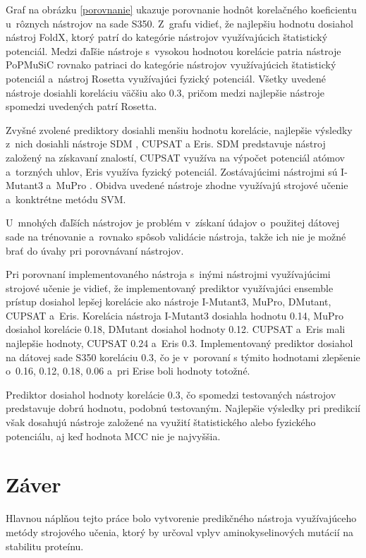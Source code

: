 Graf na obrázku \ref{porovnanie} ukazuje porovnanie hodnôt korelačného koeficientu u~rôznych nástrojov na sade S350. Z~grafu vidieť, že najlepšiu hodnotu dosiahol nástroj FoldX, ktorý patrí do kategórie nástrojov využívajúcich štatistický potenciál. Medzi ďaľšie nástroje s~vysokou hodnotou korelácie patria nástroje PoPMuSiC rovnako patriaci do kategórie nástrojov využívajúcich štatistický potenciál a~nástroj Rosetta využívajúci fyzický potenciál. Všetky uvedené nástroje dosiahli koreláciu väčšiu ako 0.3, pričom medzi najlepšie nástroje spomedzi uvedených patrí Rosetta.

Zvyšné zvolené prediktory dosiahli menšiu hodnotu korelácie, najlepšie výsledky z~nich dosiahli nástroje SDM \cite{sdm}, CUPSAT a Eris. SDM predstavuje nástroj založený na získavaní znalostí, CUPSAT využíva na výpočet potenciál atómov a~torzných uhlov, Eris využíva fyzický potenciál. Zostávajúcimi nástrojmi sú I-Mutant3 a~MuPro \cite{mupro}. Obidva uvedené nástroje zhodne využívajú strojové učenie a~konktrétne metódu SVM.
 
U~mnohých ďaľších nástrojov je problém v~získaní údajov o~použitej dátovej sade na trénovanie a~rovnako spôsob validácie nástroja, takže ich nie je možné brať do úvahy pri porovnávaní nástrojov.

Pri porovnaní implementovaného nástroja s~inými nástrojmi využívajúcimi strojové učenie je vidieť, že implementovaný prediktor využívajúci ensemble prístup dosiahol lepšej korelácie ako nástroje I-Mutant3, MuPro, DMutant, CUPSAT a~Eris. Korelácia nástroja I-Mutant3 dosiahla hodnotu 0.14, MuPro dosiahol korelácie 0.18, DMutant dosiahol hodnoty 0.12. CUPSAT a~Eris mali najlepšie hodnoty, CUPSAT 0.24 a~Eris 0.3. Implementovaný prediktor dosiahol na dátovej sade S350 koreláciu 0.3, čo je v~porovaní s týmito hodnotami zlepšenie o~0.16, 0.12, 0.18, 0.06 a~pri Erise boli hodnoty totožné.

Prediktor dosiahol hodnoty korelácie 0.3, čo spomedzi testovaných nástrojov predstavuje dobrú hodnotu, podobnú testovaným. Najlepšie výsledky pri predikcií však dosahujú nástroje založené na využití štatistického alebo fyzického potenciálu, aj keď hodnota MCC nie je najvyššia.

\chapter{Záver}

Hlavnou náplňou tejto práce bolo vytvorenie predikčného nástroja využívajúceho metódy strojového učenia, ktorý by určoval vplyv aminokyselinových mutácií na stabilitu proteínu.

